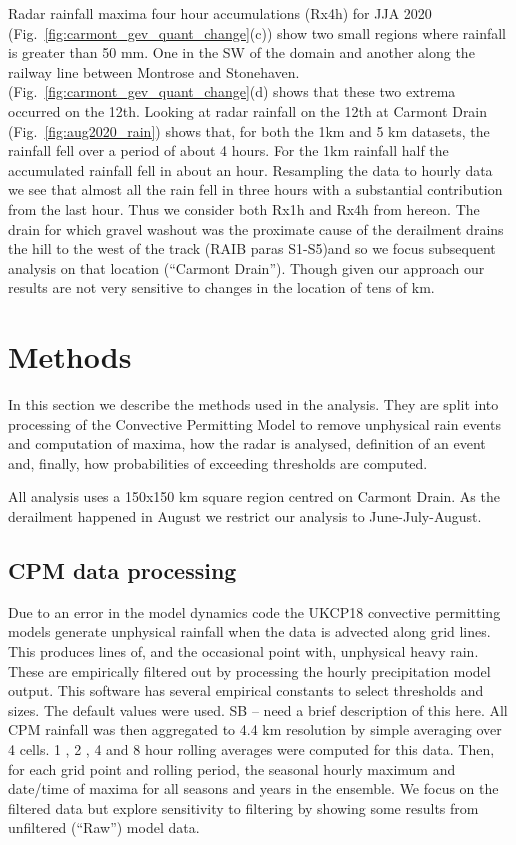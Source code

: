 \documentclass[11pt,a4paper]{article}
\begin{document}
Radar rainfall maxima four hour accumulations (Rx4h) for JJA 2020 (Fig.~\ref{fig:carmont_gev_quant_change}(c)) show two small regions  where rainfall is greater than 50 mm. One in the SW of the domain and another along the railway line between Montrose and Stonehaven. (Fig.~\ref{fig:carmont_gev_quant_change}(d) shows that these two extrema occurred on the 12th. Looking at radar rainfall on the 12th at Carmont Drain (Fig.~\ref{fig:aug2020_rain}) shows that, for both the 1km and 5 km datasets, the rainfall fell over a period of about 4 hours. For the 1km rainfall half the accumulated rainfall fell in about an hour.  Resampling the data to hourly data we see that almost all the rain fell in three hours with a substantial contribution from the last hour.  Thus we consider both Rx1h and Rx4h from hereon. The drain for which gravel washout was the proximate cause of the derailment drains the hill to the west of the track (RAIB paras S1-S5)and so we focus subsequent analysis on that location (``Carmont Drain''). Though given our approach our results are not very sensitive to changes in the location of tens of km.  

\section{Methods}
In this section we describe the methods used in the analysis. They are split into processing of the Convective Permitting Model to remove unphysical rain events  and computation of maxima, how the radar is analysed, definition of an event and, finally, how probabilities of exceeding thresholds are computed. 

All analysis uses a 150x150 km square region centred on  Carmont Drain. As the derailment happened in August we restrict our analysis to June-July-August. 

\subsection{CPM data processing}

Due to an error in the model dynamics code the UKCP18 convective permitting models generate unphysical rainfall when the data is advected along grid lines. This produces lines of, and the occasional point with, unphysical heavy rain. These are empirically filtered out  by processing the hourly precipitation model output. This software has several empirical constants to select thresholds and sizes. The default values were used.  SB -- need a brief description of this here. 
 All CPM rainfall was then aggregated to 4.4 km resolution by simple averaging over 4 cells. 1 , 2 , 4  and 8 hour rolling averages were computed for this data. Then, for each grid point and rolling period,  the seasonal hourly maximum and date/time of maxima for all seasons and years in the ensemble. We focus on the filtered data but  explore sensitivity to filtering by showing some results from unfiltered (``Raw'') model data. 
\end{document}
